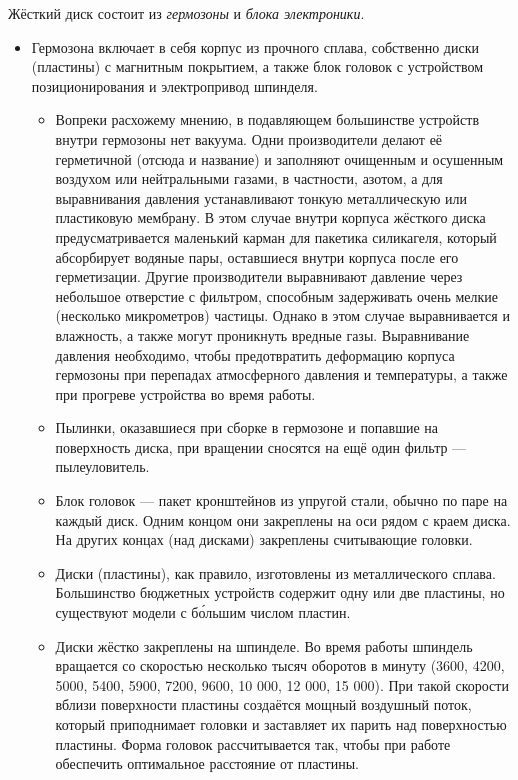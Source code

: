 Жёсткий диск состоит из \emph{гермозоны} и \emph{блока электроники}.
\begin{itemize}
 \item Гермозона включает в себя корпус из прочного сплава, собственно диски (пластины) с магнитным покрытием, а также блок головок с устройством позиционирования и электропривод шпинделя.
  \begin{itemize}
   \item Вопреки расхожему мнению, в подавляющем большинстве устройств внутри гермозоны нет вакуума.
    Одни производители делают её герметичной (отсюда и название) и заполняют очищенным и осушенным воздухом или нейтральными газами, в частности, азотом, а для выравнивания давления устанавливают тонкую металлическую или пластиковую мембрану.
    В этом случае внутри корпуса жёсткого диска предусматривается маленький карман для пакетика силикагеля, который абсорбирует водяные пары, оставшиеся внутри корпуса после его герметизации.
    Другие производители выравнивают давление через небольшое отверстие с фильтром, способным задерживать очень мелкие (несколько микрометров) частицы.
    Однако в этом случае выравнивается и влажность, а также могут проникнуть вредные газы.
    Выравнивание давления необходимо, чтобы предотвратить деформацию корпуса гермозоны при перепадах атмосферного давления и температуры, а также при прогреве устройства во время работы.
   \item Пылинки, оказавшиеся при сборке в гермозоне и попавшие на поверхность диска, при вращении сносятся на ещё один фильтр --- пылеуловитель.
   \item Блок головок --- пакет кронштейнов из упругой стали, обычно по паре на каждый диск.
    Одним концом они закреплены на оси рядом с краем диска. На других концах (над дисками) закреплены считывающие головки.
   \item Диски (пластины), как правило, изготовлены из металлического сплава.
    Большинство бюджетных устройств содержит одну или две пластины, но существуют модели с б\'{о}льшим числом пластин.
   \item Диски жёстко закреплены на шпинделе.
   Во время работы шпиндель вращается со скоростью несколько тысяч оборотов в минуту (3600, 4200, 5000, 5400, 5900, 7200, 9600, 10 000, 12 000, 15 000).
   При такой скорости вблизи поверхности пластины создаётся мощный воздушный поток, который приподнимает головки и заставляет их парить над поверхностью пластины.
   Форма головок рассчитывается так, чтобы при работе обеспечить оптимальное расстояние от пластины.

\end{itemize}
\end{itemize}
